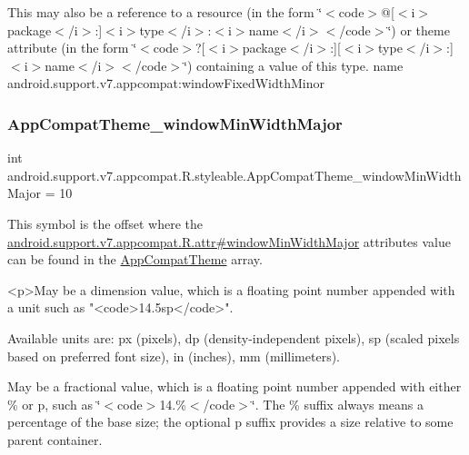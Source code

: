 This may also be a reference to a resource (in the form \char`\"{}$<$code$>$@\mbox{[}$<$i$>$package$<$/i$>$\+:\mbox{]}$<$i$>$type$<$/i$>$\+:$<$i$>$name$<$/i$>$$<$/code$>$\char`\"{}) or theme attribute (in the form \char`\"{}$<$code$>$?\mbox{[}$<$i$>$package$<$/i$>$\+:\mbox{]}\mbox{[}$<$i$>$type$<$/i$>$\+:\mbox{]}$<$i$>$name$<$/i$>$$<$/code$>$\char`\"{}) containing a value of this type.  name android.\+support.\+v7.\+appcompat\+:window\+Fixed\+Width\+Minor \mbox{\label{classandroid_1_1support_1_1v7_1_1appcompat_1_1R_1_1styleable_afd626a38693cbcfdd8ac1d5ff7c02a96}} 
\subsubsection{\texorpdfstring{App\+Compat\+Theme\+\_\+window\+Min\+Width\+Major}{AppCompatTheme\_windowMinWidthMajor}}
{\footnotesize\ttfamily int android.\+support.\+v7.\+appcompat.\+R.\+styleable.\+App\+Compat\+Theme\+\_\+window\+Min\+Width\+Major = 10\hspace{0.3cm}{\ttfamily [static]}}

This symbol is the offset where the \hyperlink{classandroid_1_1support_1_1v7_1_1appcompat_1_1R_1_1attr_aeb051e893d3a1293b81a53d5f8eecc36}{android.\+support.\+v7.\+appcompat.\+R.\+attr\#window\+Min\+Width\+Major} attribute\textquotesingle{}s value can be found in the \hyperlink{classandroid_1_1support_1_1v7_1_1appcompat_1_1R_1_1styleable_a5c42f89e8a410c323be34208d75c430b}{App\+Compat\+Theme} array.

\begin{DoxyVerb}      <p>May be a dimension value, which is a floating point number appended with a unit such as "<code>14.5sp</code>".
\end{DoxyVerb}
 Available units are\+: px (pixels), dp (density-\/independent pixels), sp (scaled pixels based on preferred font size), in (inches), mm (millimeters). 

May be a fractional value, which is a floating point number appended with either \% or p, such as \char`\"{}$<$code$>$14.\%$<$/code$>$\char`\"{}. The \% suffix always means a percentage of the base size; the optional p suffix provides a size relative to some parent container. 

